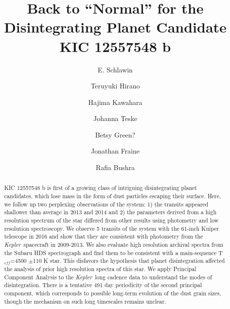 \documentclass[preprint]{aastex61}
\newcommand{\kepler}{{\it Kepler}}
\begin{document}
\title{Back to ``Normal'' for the Disintegrating Planet Candidate KIC 12557548 b}



\author{E. Schlawin}

\author{Teruyuki Hirano}

\author{Hajima Kawahara}

\author{Johanna Teske}

\author{Betsy Green?}

\author{Jonathan Fraine}

\author{Rafia Bushra}

\begin{abstract}
KIC 12557548 b is first of a growing class of intriguing disintegrating planet candidates, which lose mass in the form of dust particles escaping their surface.
Here, we follow up two perplexing observations of the system: 1) the transits appeared shallower than average in 2013 and 2014 and 2) the parameters derived from a high resolution spectrum of the star differed from other results using photometry and low resolution spectroscopy.
We observe 5 transits of the system with the 61-inch Kuiper telescope in 2016 and show that they are consistent with photometry from the \kepler\ spacecraft in 2009-2013.
We also evaluate high resolution archival spectra from the Subaru HDS spectrograph and find them to be consistent with a main-sequence T$_{eff}$=4500 $\pm$110 K star.
This disfavors the hypothesis that planet disintegration affected the analysis of prior high resolution spectra of this star.
We apply Principal Component Analysis to the \kepler\ long cadence data to understand the modes of disintegration.
There is a tentative 491 day periodicity of the second principal component, which corresponds to possible long-term evolution of the dust grain sizes, though the mechanism on such long timescales remains unclear.
\end{abstract}
\end{document}

